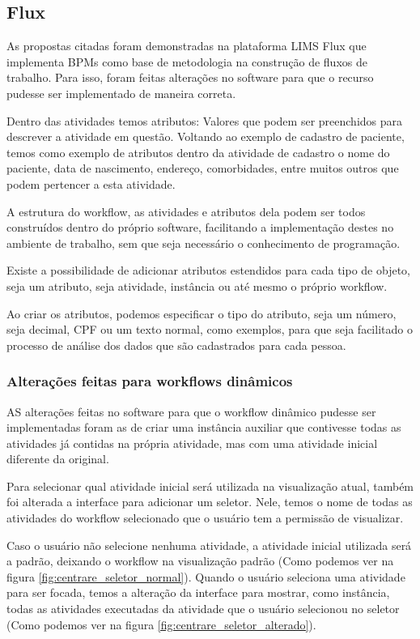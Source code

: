 \subsection{Flux}

As propostas citadas foram demonstradas na plataforma LIMS Flux que implementa BPMs como base de metodologia na construção de fluxos de trabalho. Para isso, foram feitas alterações no software para que o recurso pudesse ser implementado de maneira correta.

Dentro das atividades temos atributos: Valores que podem ser preenchidos para descrever a atividade em questão. Voltando ao exemplo de cadastro de paciente, temos como exemplo de atributos dentro da atividade de cadastro o nome do paciente, data de nascimento, endereço, comorbidades, entre muitos outros que podem pertencer a esta atividade.

A estrutura do workflow, as atividades e atributos dela podem ser todos construídos dentro do próprio software, facilitando a implementação destes no ambiente de trabalho, sem que seja necessário o conhecimento de programação.

Existe a possibilidade de adicionar atributos estendidos para cada tipo de objeto, seja um atributo, seja atividade, instância ou até mesmo o próprio workflow.

Ao criar os atributos, podemos especificar o tipo do atributo, seja um número, seja decimal, CPF ou um texto normal, como exemplos, para que seja facilitado o processo de análise dos dados que são cadastrados para cada pessoa.

 \subsubsection{Alterações feitas para workflows dinâmicos}

AS alterações feitas no software para que o workflow dinâmico pudesse ser implementadas foram as de criar uma instância auxiliar que contivesse todas as atividades já contidas na própria atividade, mas com uma atividade inicial diferente da original.

Para selecionar qual atividade inicial será utilizada na visualização atual, também foi alterada a interface para adicionar um seletor. Nele, temos o nome de todas as atividades do workflow selecionado que o usuário tem a permissão de visualizar.

Caso o usuário não selecione nenhuma atividade, a atividade inicial utilizada será a padrão, deixando o workflow na visualização padrão (Como podemos ver na figura \ref{fig:centrare_seletor_normal}). Quando o usuário seleciona uma atividade para ser focada, temos a alteração da interface para mostrar, como instância, todas as atividades executadas da atividade que o usuário selecionou no seletor (Como podemos ver na figura \ref{fig:centrare_seletor_alterado}).

